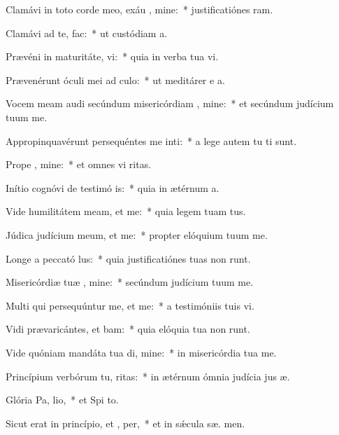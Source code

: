 \item Clamávi in toto corde meo, exáu , mine:~* justificatiónes  ram.
\item Clamávi ad te,   fac:~* ut custódiam  a.
\item Prævéni in maturitáte,  vi:~* quia in verba tua vi.
\item Prævenérunt óculi mei ad  culo:~* ut meditárer e a.
\item Vocem meam audi secúndum misericórdiam , mine:~* et secúndum judícium tuum  me.
\item Appropinquavérunt persequéntes me inti:~* a lege autem tu  ti sunt.
\item Prope  , mine:~* et omnes vi  ritas.
\item Inítio cognóvi de testimó is:~* quia in ætérnum  a.
\item Vide humilitátem meam, et  me:~* quia legem tuam   tus.
\item Júdica judícium meum, et  me:~* propter elóquium tuum  me.
\item Longe a peccató lus:~* quia justificatiónes tuas non runt.
\item Misericórdiæ tuæ , mine:~* secúndum judícium tuum  me.
\item Multi qui persequúntur me, et  me:~* a testimóniis tuis  vi.
\item Vidi prævaricántes, et bam:~* quia elóquia tua non runt.
\item Vide quóniam mandáta tua di, mine:~* in misericórdia tua  me.
\item Princípium verbórum tu, ritas:~* in ætérnum ómnia judícia jus æ.
\item Glória Pa,  lio,~* et Spi to.
\item Sicut erat in princípio, et ,  per,~* et in sǽcula sæ. men.

